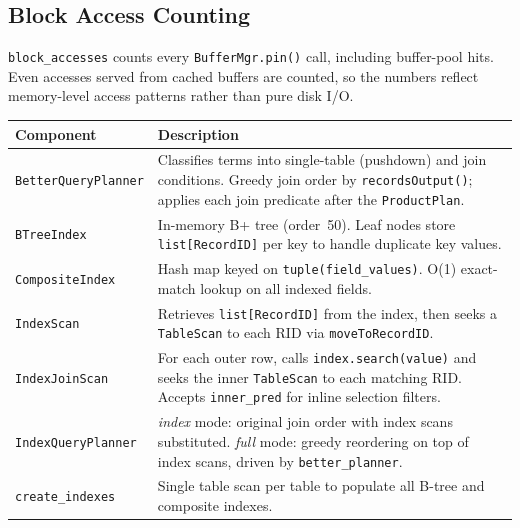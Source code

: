 \documentclass[12pt,a4paper]{article}
\begin{document}
\subsection{Block Access Counting}

\texttt{block\_accesses} counts every \texttt{BufferMgr.pin()} call, including buffer-pool
hits. Even accesses served from cached buffers are counted, so the numbers reflect
memory-level access patterns rather than pure disk I/O.

\begin{center}
  \begin{tabular}{l p{9.5cm}}
    \toprule
    \textbf{Component}          & \textbf{Description}                                         \\
    \midrule
    \texttt{BetterQueryPlanner} & Classifies terms into single-table (pushdown) and join
    conditions. Greedy join order by \texttt{recordsOutput()};
    applies each join predicate after the \texttt{ProductPlan}.                                \\
    \texttt{BTreeIndex}         & In-memory B+ tree (order~50). Leaf nodes store
    \texttt{list[RecordID]} per key to handle duplicate
    key values.                                                                                \\
    \texttt{CompositeIndex}     & Hash map keyed on \texttt{tuple(field\_values)}.
    O(1) exact-match lookup on all indexed fields.                                             \\
    \texttt{IndexScan}          & Retrieves \texttt{list[RecordID]} from the index, then seeks
    a \texttt{TableScan} to each RID via \texttt{moveToRecordID}.                              \\
    \texttt{IndexJoinScan}      & For each outer row, calls \texttt{index.search(value)} and
    seeks the inner \texttt{TableScan} to each matching RID.
    Accepts \texttt{inner\_pred} for inline selection filters.                                 \\
    \texttt{IndexQueryPlanner}  & \textit{index} mode: original join order with index scans
    substituted. \textit{full} mode: greedy reordering on top of
    index scans, driven by \texttt{better\_planner}.                                           \\
    \texttt{create\_indexes}    & Single table scan per table to populate all B-tree and
    composite indexes.                                                                         \\
    \bottomrule
  \end{tabular}
\end{center}
\end{document}
